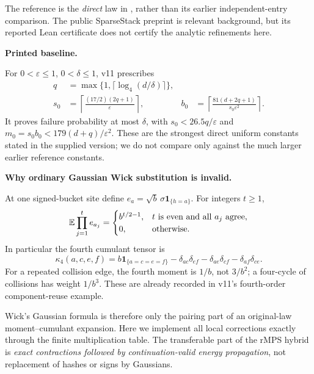 \documentclass[11pt]{article}
\numberwithin{equation}{section}
\theoremstyle{definition}\newtheorem{definition}[theorem]{Definition}
\theoremstyle{remark}\newtheorem{remark}[theorem]{Remark}
\newcommand{\one}{\mathbf1}\newcommand{\F}{\mathbb F}
\newcommand{\step}[1]{\par\addvspace{.65\baselineskip}\Needspace{4\baselineskip}\noindent\textbf{#1}\par\nobreak\smallskip}
\begin{document}
The reference is the \emph{direct} law in \cite[appendix ``A direct SparseStack proof with explicit constants'']{Framework}, rather than its earlier independent-entry comparison. The public SparseStack preprint \cite{SparseSource} is relevant background, but its reported Lean certificate does not certify the analytic refinements here.

\step{Printed baseline.}
For $0<\varepsilon\le1$, $0<\delta\le1$, v11 prescribes
\begin{align}
 q&=\max\{1,\lceil\log_4(d/\delta)\rceil\},\nonumber\\
 s_0&=\left\lceil\frac{(17/2)(2q+1)}{\varepsilon}\right\rceil,
 &b_0&=\left\lceil\frac{81(d+2q+1)}{s_0\varepsilon^2}\right\rceil.
 \label{eq:old-prescription}
\end{align}
It proves failure probability at most $\delta$, with $s_0<26.5q/\varepsilon$ and $m_0=s_0b_0<179(d+q)/\varepsilon^2$. These are the strongest direct uniform constants stated in the supplied version; we do not compare only against the much larger earlier reference constants.

\step{Why ordinary Gaussian Wick substitution is invalid.}
At one signed-bucket site define $e_a=\sqrt b\,\sigma\one_{\{h=a\}}$. For integers $t\ge1$,
\begin{equation}
 \mathbb E\prod_{j=1}^{t}e_{a_j}=
 \begin{cases}
 b^{t/2-1},&t\text{ is even and all }a_j\text{ agree},\\
 0,&\text{otherwise}.
 \end{cases}
 \label{eq:local-moments}
\end{equation}
In particular the fourth cumulant tensor is
\begin{equation}
 \kappa_4(a,c,e,f)=b\one_{\{a=c=e=f\}}
 -\delta_{ac}\delta_{ef}-\delta_{ae}\delta_{cf}-\delta_{af}\delta_{ce}.
 \label{eq:cumulant}
\end{equation}
For a repeated collision edge, the fourth moment is $1/b$, not $3/b^2$; a four-cycle of collisions has weight $1/b^3$. These are already recorded in v11's fourth-order component-reuse example.

Wick's Gaussian formula \cite{Isserlis} is therefore only the pairing part of an original-law moment--cumulant expansion. Here we implement all local corrections exactly through the finite multiplication table. The transferable part of the rMPS hybrid \cite{Hybrid} is \emph{exact contractions followed by continuation-valid energy propagation}, not replacement of hashes or signs by Gaussians.
\end{document}
